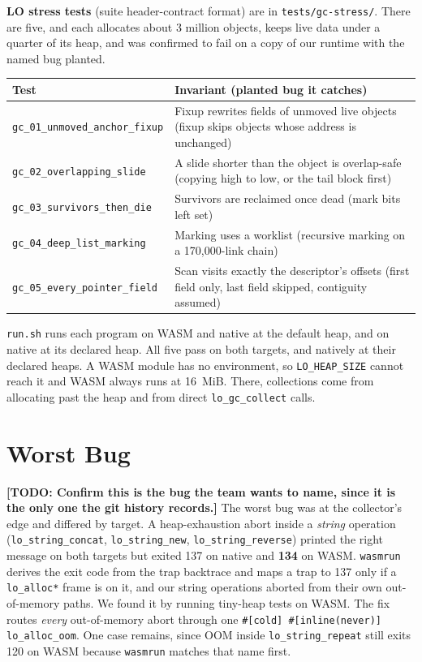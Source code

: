 \documentclass[10pt]{article}
\newcommand{\code}[1]{\texttt{\small #1}}
\newcommand{\todo}[1]{\textcolor{red!70!black}{\textbf{[TODO: #1]}}}
\begin{document}
\textbf{LO stress tests} (suite header-contract format) are in \code{tests/gc-stress/}. There are five, and each allocates about 3 million objects, keeps live data under a quarter of its heap, and was confirmed to fail on a copy of our runtime with the named bug planted.
\begin{center}\small
\begin{tabularx}{\linewidth}{@{}l X@{}}
\toprule
\textbf{Test} & \textbf{Invariant (planted bug it catches)} \\
\midrule
\code{gc\_01\_unmoved\_anchor\_fixup} & Fixup rewrites fields of unmoved live objects (fixup skips objects whose address is unchanged) \\
\code{gc\_02\_overlapping\_slide} & A slide shorter than the object is overlap-safe (copying high to low, or the tail block first) \\
\code{gc\_03\_survivors\_then\_die} & Survivors are reclaimed once dead (mark bits left set) \\
\code{gc\_04\_deep\_list\_marking} & Marking uses a worklist (recursive marking on a 170{,}000-link chain) \\
\code{gc\_05\_every\_pointer\_field} & Scan visits exactly the descriptor's offsets (first field only, last field skipped, contiguity assumed) \\
\bottomrule
\end{tabularx}
\end{center}
\code{run.sh} runs each program on WASM and native at the default heap, and on native at its declared heap. All five pass on both targets, and natively at their declared heaps. A WASM module has no environment, so \code{LO\_HEAP\_SIZE} cannot reach it and WASM always runs at 16~MiB. There, collections come from allocating past the heap and from direct \code{lo\_gc\_collect} calls.

\section{Worst Bug}
\todo{Confirm this is the bug the team wants to name, since it is the only one the git history records.} The worst bug was at the collector's edge and differed by target. A heap-exhaustion abort inside a \emph{string} operation (\code{lo\_string\_concat}, \code{lo\_string\_new}, \code{lo\_string\_reverse}) printed the right message on both targets but exited 137 on native and \textbf{134} on WASM. \code{wasmrun} derives the exit code from the trap backtrace and maps a trap to 137 only if a \code{lo\_alloc*} frame is on it, and our string operations aborted from their own out-of-memory paths. We found it by running tiny-heap tests on WASM. The fix routes \emph{every} out-of-memory abort through one \code{\#[cold] \#[inline(never)] lo\_alloc\_oom}. One case remains, since OOM inside \code{lo\_string\_repeat} still exits 120 on WASM because \code{wasmrun} matches that name first.
\end{document}
